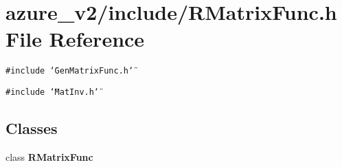 \section{azure\_\-v2/include/RMatrix\-Func.h File Reference}
\label{RMatrixFunc_8h}
{\tt \#include \char`\"{}Gen\-Matrix\-Func.h\char`\"{}}\par
{\tt \#include \char`\"{}Mat\-Inv.h\char`\"{}}\par
\subsection*{Classes}
\begin{CompactItemize}
\item 
class \bf{RMatrix\-Func}
\end{CompactItemize}
